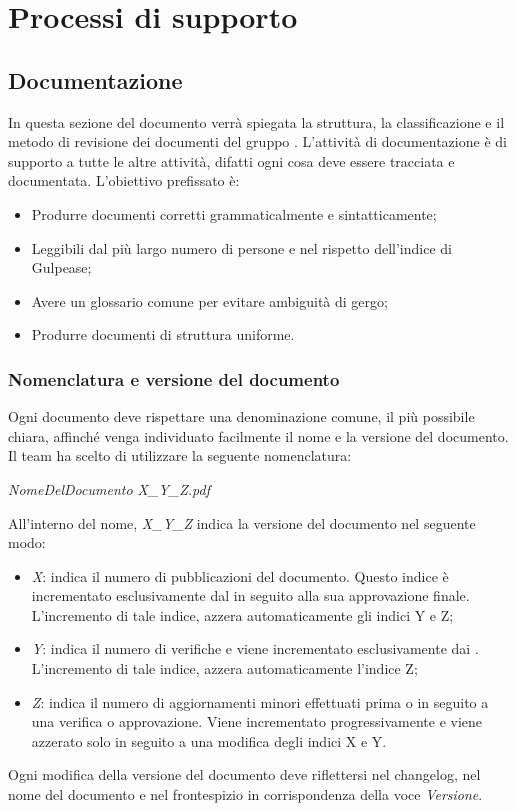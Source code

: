 \newpage

\section{Processi di supporto}

	\subsection{Documentazione}
	In questa sezione del documento verrà spiegata la struttura, la classificazione e il metodo di revisione dei documenti del gruppo \textit{\gruppo}.
	L'attività di documentazione è di supporto a tutte le altre attività, difatti ogni cosa deve essere tracciata e documentata.
	L'obiettivo prefissato è:
	\begin{itemize}
		\item Produrre documenti corretti grammaticalmente e sintatticamente;
		\item Leggibili dal più largo numero di persone e nel rispetto dell'indice di Gulpease;
		\item Avere un glossario comune per evitare ambiguità di gergo;
		\item Produrre documenti di struttura uniforme.
	\end{itemize}
	
		\subsubsection{Nomenclatura e versione del documento}
		Ogni documento deve rispettare una denominazione comune, il più possibile chiara, affinché venga individuato facilmente il nome e la versione del documento. Il team ha scelto di utilizzare la seguente nomenclatura:
		\begin{center}
			\textit{NomeDelDocumento X\_Y\_Z.pdf}
		\end{center}
		All'interno del nome, \textit{X\_Y\_Z} indica la versione del documento nel seguente modo:
		\begin{itemize}
			\item \textit{X}: indica il numero di pubblicazioni del documento. Questo indice è incrementato esclusivamente dal \textit{\RdP} in seguito alla sua approvazione finale. L’incremento di tale indice, azzera automaticamente gli indici Y e Z;
			\item \textit{Y}: indica il numero di verifiche e viene incrementato esclusivamente dai \textit{\Vers}. L'incremento di tale indice, azzera automaticamente l'indice Z;
			\item \textit{Z}: indica il numero di aggiornamenti minori effettuati prima o in seguito a una verifica o approvazione. Viene incrementato progressivamente e viene azzerato solo in seguito a una modifica degli indici X e Y.
		\end{itemize}
		Ogni modifica della versione del documento deve riflettersi nel changelog, nel nome del documento e nel frontespizio in corrispondenza della voce \textit{Versione}.
	
